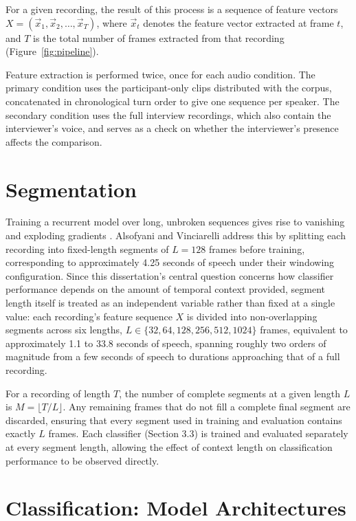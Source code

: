 \documentclass{mproj}
\begin{document}
For a given recording, the result of this process is a sequence of feature vectors $X = (\vec{x}_1, \vec{x}_2, \ldots, \vec{x}_T)$, where $\vec{x}_t$ denotes the feature vector extracted at frame $t$, and $T$ is the total number of frames extracted from that recording (Figure~\ref{fig:pipeline}).

Feature extraction is performed twice, once for each audio condition. The primary condition uses the participant-only clips distributed with the corpus, concatenated in chronological turn order to give one sequence per speaker. The secondary condition uses the full interview recordings, which also contain the interviewer's voice, and serves as a check on whether the interviewer's presence affects the comparison.

\section{Segmentation}\label{sec:segmentation}

Training a recurrent model over long, unbroken sequences gives rise to vanishing and exploding gradients \cite{pascanu2013}. Alsofyani and Vinciarelli \cite{alsofyani2021} address this by splitting each recording into fixed-length segments of $L = 128$ frames before training, corresponding to approximately 4.25 seconds of speech under their windowing configuration. Since this dissertation's central question concerns how classifier performance depends on the amount of temporal context provided, segment length itself is treated as an independent variable rather than fixed at a single value: each recording's feature sequence $X$ is divided into non-overlapping segments across six lengths, $L \in \{32, 64, 128, 256, 512, 1024\}$ frames, equivalent to approximately 1.1 to 33.8 seconds of speech, spanning roughly two orders of magnitude from a few seconds of speech to durations approaching that of a full recording.

For a recording of length $T$, the number of complete segments at a given length $L$ is $M = \lfloor T / L \rfloor$. Any remaining frames that do not fill a complete final segment are discarded, ensuring that every segment used in training and evaluation contains exactly $L$ frames. Each classifier (Section 3.3) is trained and evaluated separately at every segment length, allowing the effect of context length on classification performance to be observed directly.

\section{Classification: Model Architectures}\label{sec:models}
\end{document}
